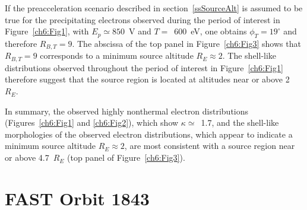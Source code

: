   If the preacceleration scenario described in section~\ref{ssSourceAlt} is
  assumed to be true for the precipitating electrons observed during the period
  of interest in Figure~\ref{ch6:Fig1}, with $E_p \simeq 850$~V and
  $T =$~600~eV, one obtains $\phi_T = 19^\circ$ and therefore $R_{B,T} = 9$. The
  abscissa of the top panel in Figure~\ref{ch6:Fig3} shows that $R_{B,T} = 9$
  corresponds to a minimum source altitude $R_E \approx 2$.
  The shell-like distributions observed throughout the period of interest in
  Figure~\ref{ch6:Fig1} therefore suggest that the source region is
  located at altitudes near or above 2~$R_E$.

  In summary, the observed highly nonthermal electron distributions
  (Figures~\ref{ch6:Fig1} and \ref{ch6:Fig2}), which show $\kappa
  \simeq$~1.7, and the shell-like morphologies of the observed electron
  distributions, which appear to indicate a minimum source altitude $R_E
  \approx 2$, are most consistent with a source region near or above
  4.7~$R_E$ (top panel of Figure~\ref{ch6:Fig3}).





  
  \section{FAST Orbit 1843}


